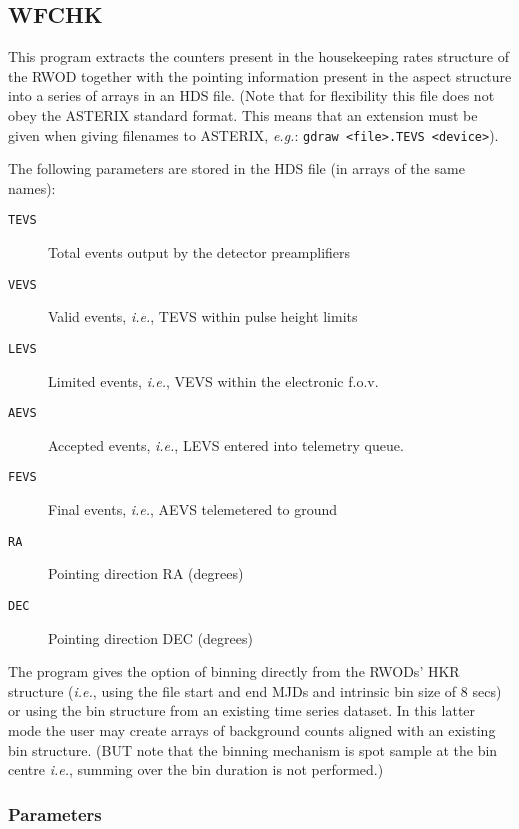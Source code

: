 \subsection{WFCHK}
\label{sec:programs:wfchk}

This program extracts the counters present in the housekeeping rates
structure of the RWOD together with the pointing information present in
the aspect structure into a series of arrays in an HDS file. (Note that
for flexibility this file does not obey the ASTERIX standard format.
This means that an extension must be given when giving filenames to
ASTERIX, {\em e.g.}: {\tt gdraw \verb+<+file\verb+>+.TEVS
\verb+<+device\verb+>+}).

The following parameters are stored in the HDS file (in arrays
of the same names):

\begin{description}
\begin{description}
\item [{\tt TEVS}] Total events output by the detector preamplifiers
\item [{\tt VEVS}] Valid events, {\em i.e.}, TEVS within pulse height limits
\item [{\tt LEVS}] Limited events, {\em i.e.}, VEVS within the electronic f.o.v.
\item [{\tt AEVS}] Accepted events, {\em i.e.}, LEVS entered into telemetry queue.
\item [{\tt FEVS}] Final events, {\em i.e.}, AEVS telemetered to ground
\item [{\tt RA}]   Pointing direction RA (degrees)
\item [{\tt DEC}]  Pointing direction DEC (degrees)
\end{description}
\end{description}

The program gives the option of binning directly from the RWODs' HKR
structure ({\em i.e.}, using the file start and end MJDs and intrinsic
bin size of 8 secs) or using the bin structure from an existing time
series dataset.  In this latter mode the user may create arrays of
background counts aligned with an existing bin structure. (BUT note
that the binning mechanism is spot sample at the bin centre {\em i.e.},
summing over the bin duration is not performed.)

\subsubsection{Parameters}

